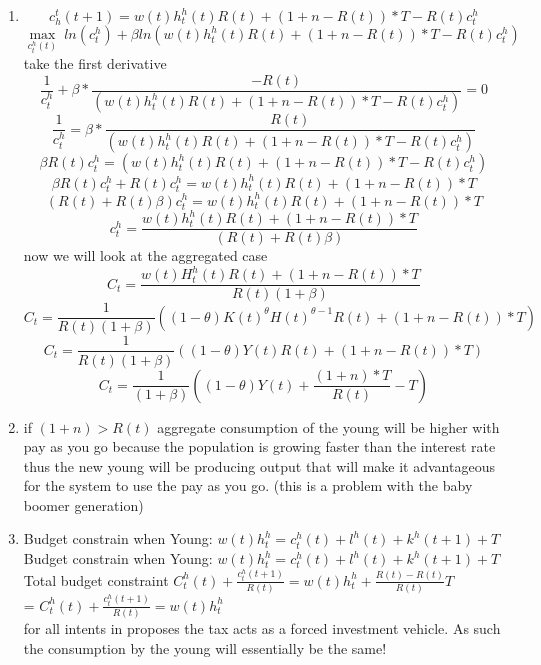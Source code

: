 \begin{enumerate}
    \item  
    $$ c^t_h(t+1) = w(t)h^h_t(t)R(t)+(1+n-R(t))*T-R(t)c^h_t$$
    $$\max_{c^h_t(t)} ~ ln(c_t^h)+\beta ln(w(t)h^h_t(t)R(t)+(1+n-R(t))*T-R(t)c^h_t)$$
    take the first derivative 
    $$ \frac{1}{c_t^h}+\beta*\frac{-R(t)}{(w(t)h^h_t(t)R(t)+(1+n-R(t))*T-R(t)c^h_t)}=0$$
    $$ \frac{1}{c_t^h}=\beta*\frac{R(t)}{(w(t)h^h_t(t)R(t)+(1+n-R(t))*T-R(t)c^h_t)}$$
    $$ \beta R(t)c_t^h=(w(t)h^h_t(t)R(t)+(1+n-R(t))*T-R(t)c^h_t)$$
    $$ \beta R(t)c_t^h+R(t)c^h_t=w(t)h^h_t(t)R(t)+(1+n-R(t))*T$$
    $$ (R(t)+R(t)\beta)c^h_t=w(t)h^h_t(t)R(t)+(1+n-R(t))*T$$
    $$ c^h_t=\frac{w(t)h^h_t(t)R(t)+(1+n-R(t))*T}{(R(t)+R(t)\beta)}$$
    now we will look at the aggregated case
    $$ C_t=\frac{w(t)H^h_t(t)R(t)+(1+n-R(t))*T}{R(t)(1+\beta)}$$
    $$ C_t=\frac{1}{R(t)(1+\beta)}((1-\theta)K(t)^{\theta} H(t)^{\theta-1}R(t)+(1+n-R(t))*T)$$
    $$ C_t=\frac{1}{R(t)(1+\beta)}((1-\theta)Y(t)R(t)+(1+n-R(t))*T)$$
    $$ C_t=\frac{1}{(1+\beta)}((1-\theta)Y(t)+\frac{(1+n)*T}{R(t)}-T)$$
    
    \item
    if $(1+n)>R(t)$ aggregate consumption of the young will be higher with pay as you go because the population is growing faster than the interest rate thus the new young will be producing output that will make it advantageous for the system to use the pay as you go. (this is a problem with the baby boomer generation) 
    \item
    Budget constrain when Young: $w(t)h^h_t=c^h_t(t)+l^h(t)+k^h(t+1)+T$\\
     Budget constrain when Young: $w(t)h^h_t=c^h_t(t)+l^h(t)+k^h(t+1)+T$\\
     Total budget constraint $C^h_t(t)+\frac{c^h_t(t+1)}{R(t)}= w(t)h_t^h+\frac{R(t)-R(t)}{R(t)}T$\\= $C^h_t(t)+\frac{c^h_t(t+1)}{R(t)}= w(t)h_t^h$\\
     for all intents in proposes the tax acts as a forced investment vehicle. As such the consumption by the young will essentially be the same!
     

\end{enumerate}